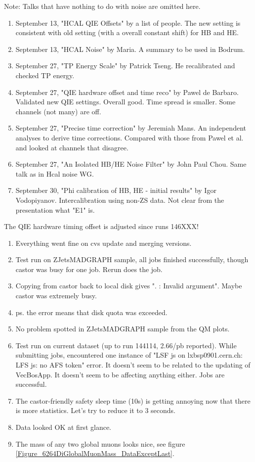 
Note: Talks that have nothing to do with noise are omitted here.

\begin{enumerate}
\item September 13, "HCAL QIE Offsets" by a list of people.  The new setting is consistent with old setting (with a overall constant shift) for HB and HE.
\item September 13, "HCAL Noise" by Maria.  A summary to be used in Bodrum.
\item September 27, "TP Energy Scale" by Patrick Tseng.  He recalibrated and checked TP energy.
\item September 27, "QIE hardware offset and time reco" by Pawel de Barbaro.  Validated new QIE settings.  Overall good.  Time spread is smaller.  Some channels (not many) are off.
\item September 27, "Precise time correction" by Jeremiah Mans.  An independent analyses to derive time corrections.  Compared with those from Pawel et al. and looked at channels that disagree.
\item September 27, "An Isolated HB/HE Noise Filter" by John Paul Chou.  Same talk as in Hcal noise WG.
\item September 30, "Phi calibration of HB, HE - initial results" by Igor Vodopiyanov.  Intercalibration using non-ZS data.  Not clear from the presentation what "E1" is.
\end{enumerate}

The QIE hardware timing offset is adjusted since runs 146XXX! 


\begin{enumerate}
\item Everything went fine on cvs update and merging versions.
\item Test run on ZJetsMADGRAPH sample, all jobs finished successfully, though castor was busy for one job.  Rerun does the job.
\item Copying from castor back to local disk gives ". : Invalid argument".  Maybe castor was extremely busy.
\item ps. the error means that disk quota was exceeded.
\item No problem spotted in ZJetsMADGRAPH sample from the QM plots.
\item Test run on current dataset (up to run 144114, 2.66/pb reported).  While submitting jobs, encountered one instance of
"LSF js on lxbsp0901.cern.ch: LFS js: no AFS token" error.  It doesn't seem to be related to the updating of VecBosApp.
It doesn't seem to be affecting anything either.  Jobs are successful.
\item The castor-friendly safety sleep time (10s) is getting annoying now that there is more statistics.  Let's try to reduce it to 3 seconds.
\item Data looked OK at first glance.
\item The mass of any two global muons looks nice, see figure \ref{Figure_6264DiGlobalMuonMass_DataExceptLast}.
\end{enumerate}

